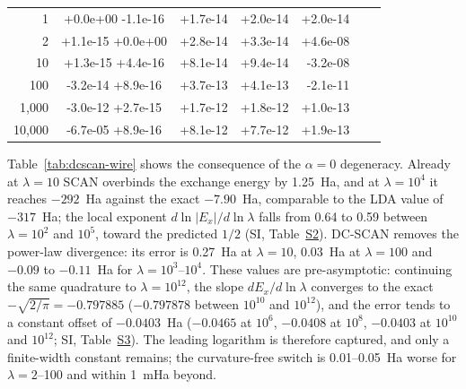 \documentclass[journal=jctcce,manuscript=article]{achemso}
\begin{document}
\begin{table}[H]
{\begin{tabular}{@{}r|rrr|rrrr|rrrrrr@{}}
\midrule
1 & \multicolumn{3}{c|}{+0.0e+00 \qquad -1.1e-16} & +1.7e-14 & +2.0e-14 & +2.0e-14 &  & \multicolumn{6}{l}{} \\
2 & \multicolumn{3}{c|}{+1.1e-15 \qquad +0.0e+00} & +2.8e-14 & +3.3e-14 & +4.6e-08 &  & \multicolumn{6}{l}{} \\
10 & \multicolumn{3}{c|}{+1.3e-15 \qquad +4.4e-16} & +8.1e-14 & +9.4e-14 & -3.2e-08 &  & \multicolumn{6}{l}{} \\
100 & \multicolumn{3}{c|}{-3.2e-14 \qquad +8.9e-16} & +3.7e-13 & +4.1e-13 & -2.1e-11 &  & \multicolumn{6}{l}{} \\
1,000 & \multicolumn{3}{c|}{-3.0e-12 \qquad +2.7e-15} & +1.7e-12 & +1.8e-12 & +1.0e-13 &  & \multicolumn{6}{l}{} \\
10,000 & \multicolumn{3}{c|}{-6.7e-05 \qquad +8.9e-16} & +8.1e-12 & +7.7e-12 & +1.9e-13 &  & \multicolumn{6}{l}{} \\
\bottomrule
\end{tabular}
}
\end{table}

Table~\ref{tab:dcscan-wire} shows the consequence of the $\alpha=0$
degeneracy.  Already at $\lambda=10$ SCAN overbinds the exchange energy by
1.25~Ha, and at $\lambda=10^4$ it reaches $-292$~Ha against the exact
$-7.90$~Ha, comparable to the LDA value of $-317$~Ha; the local exponent
$d\ln|E_x|/d\ln\lambda$ falls from 0.64 to 0.59 between $\lambda=10^2$ and
$10^5$, toward the predicted $1/2$ (SI, Table~\href{si.pdf\#table.2}{S2}).
DC-SCAN removes the power-law divergence: its error is 0.27~Ha at
$\lambda=10$, 0.03~Ha at $\lambda=100$ and $-0.09$ to $-0.11$~Ha for
$\lambda=10^3$--$10^4$.  These values are pre-asymptotic: continuing the same
quadrature to $\lambda=10^{12}$, the slope $dE_x/d\ln\lambda$ converges to the
exact $-\sqrt{2/\pi}=-0.797885$ ($-0.797878$ between $10^{10}$ and
$10^{12}$), and the error tends to a constant offset of $-0.0403$~Ha
($-0.0465$ at $10^6$, $-0.0408$ at $10^8$, $-0.0403$ at $10^{10}$ and
$10^{12}$; SI, Table~\href{si.pdf\#table.3}{S3}).  The leading logarithm is
therefore captured, and only a finite-width constant remains; the
curvature-free switch is 0.01--0.05~Ha worse for $\lambda=2$--100 and within
1~mHa beyond.
\end{document}
